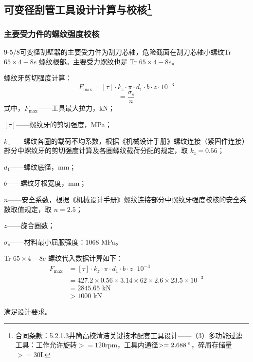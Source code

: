 \subsection[可变径刮管工具设计计算与校核]{可变径刮管工具设计计算与校核\protect\footnote{合同条款：5.2.1.3井筒高校清洁关键技术配套工具设计——（3）多功能过滤工具：工作允许旋转$>=120\text{rpm}$，工具内通径$>=2.688\,\text{''}$，碎屑存储量$>=30\textrm{L}$}}
\subsubsection{主要受力件的螺纹强度校核}
9-5/8\inch 可变径刮壁器的主要受力件为刮刀芯轴，危险截面在刮刀芯轴小螺纹Tr$65 \times 4 - 8e$ 螺纹根部。主要受力螺纹也是 Tr $65 \times 4 - 8e$。

螺纹牙剪切强度计算：
\begin{equation}
    F_{\text{max}} = [\tau] \cdot k_z \cdot \pi \cdot d_1 \cdot b \cdot z \cdot 10^{-3}
\end{equation}
\begin{equation}
    [\tau] = \frac{\sigma_s}{n}
\end{equation}
式中，$F_{\text{max}}$——工具最大拉力，kN；

    $[\tau]$——螺纹牙的剪切强度，MPa；
    
    $k_z$——螺纹各圈的载荷不均系数，根据《机械设计手册》螺纹连接（紧固件连接）部分中螺纹牙的剪切强度计算及各圈螺纹载荷分配的规定\cite{ref26}，取 $k_z = 0.56$；
    
    $d_1$——螺纹底径，mm；
    
    $b$——螺纹牙根宽度，mm；
    
    $n$——安全系数，根据《机械设计手册》螺纹连接部分中螺纹牙强度校核的安全系数取值规定\cite{ref26}，取 $n = 2.5$；
    
    $z$——旋合圈数；
    
    $\sigma_s$——材料最小屈服强度：1068 MPa。


Tr $65 \times 4 - 8e$ 螺纹代入数据计算如下：
\begin{align}
    F_{\text{max}} &= [\tau] \cdot k_z \cdot \pi \cdot d_1 \cdot b \cdot z \cdot 10^{-3} \\
                   &= 427.2 \times 0.56 \times 3.14 \times 62 \times 2.6 \times 23.5 \times 10^{-3} \\
                   &= 2845.65 \text{ kN} \\
                   &> 1000 \text{ kN}
\end{align}

满足设计要求。

